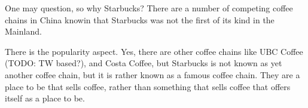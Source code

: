 One may question, so why Starbucks? There are a number of competing coffee
chains in China knowin that Starbucks was not the first of its kind in the
Mainland.

There is the popularity aspect. Yes, there are other coffee chains like UBC
Coffee (TODO: TW based?), and Costa Coffee, but Starbucks is not known as yet
another coffee chain, but it is rather known as a famous coffee chain. They are
a place to be that sells coffee, rather than something that sells coffee that
offers itself as a place to be.


